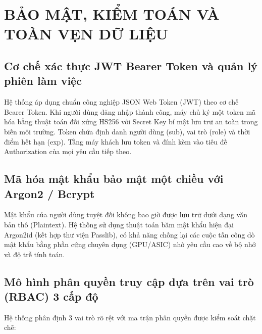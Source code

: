 \chapter{BẢO MẬT, KIỂM TOÁN VÀ TOÀN VẸN DỮ LIỆU}

\section{Cơ chế xác thực JWT Bearer Token và quản lý phiên làm việc}

Hệ thống áp dụng chuẩn công nghiệp JSON Web Token (JWT) theo cơ chế Bearer Token. Khi người dùng đăng nhập thành công, máy chủ ký một token mã hóa bằng thuật toán đối xứng HS256 với Secret Key bí mật lưu trữ an toàn trong biến môi trường. Token chứa định danh người dùng (sub), vai trò (role) và thời điểm hết hạn (exp). Tầng máy khách lưu token và đính kèm vào tiêu đề Authorization của mọi yêu cầu tiếp theo.

\section{Mã hóa mật khẩu bảo mật một chiều với Argon2 / Bcrypt}

Mật khẩu của người dùng tuyệt đối không bao giờ được lưu trữ dưới dạng văn bản thô (Plaintext). Hệ thống sử dụng thuật toán băm mật khẩu hiện đại Argon2id (kết hợp thư viện Passlib), có khả năng chống lại các cuộc tấn công dò mật khẩu bằng phần cứng chuyên dụng (GPU/ASIC) nhờ yêu cầu cao về bộ nhớ và độ trễ tính toán.

\section{Mô hình phân quyền truy cập dựa trên vai trò (RBAC) 3 cấp độ}

Hệ thống phân định 3 vai trò rõ rệt với ma trận phân quyền được kiểm soát chặt chẽ:

